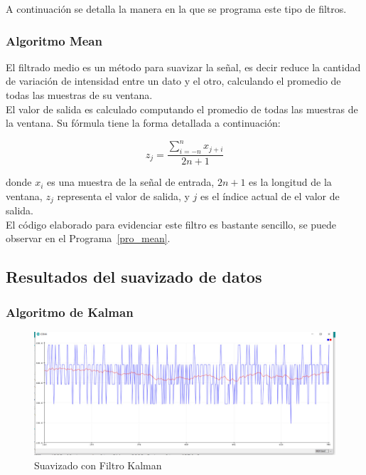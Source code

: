 \documentclass[10pt,a4paper]{article}
\begin{document}
A continuación se detalla la manera en la que se programa este tipo de filtros.



\subsubsection{Algoritmo Mean}
El filtrado medio es un método para suavizar la señal, es decir reduce la cantidad de variación de intensidad entre un dato y el otro, calculando el promedio de todas las muestras de su ventana.\\

El valor de salida es calculado computando el promedio de todas las muestras de la ventana. Su fórmula tiene la forma detallada a continuación:

\begin{equation}
z_j = \displaystyle\frac{\displaystyle\sum_{i=-n}^n x_{j+i}}{2n+1}
\end{equation}

donde $x_i$ es una muestra de la señal de entrada, $2n+1$ es la longitud de la ventana, $z_j$ representa el valor de salida, y $j$ es el índice actual de el valor de salida.\\

El código elaborado para evidenciar este filtro es bastante sencillo, se puede observar en el Programa~\ref{pro_mean}.




\subsection{Resultados del suavizado de datos}
\subsubsection{Algoritmo de Kalman}

\begin{figure}[H]
\centering
\includegraphics[scale=0.3]{kalman}
\caption{Suavizado con Filtro Kalman}
\end{figure}
\end{document}
